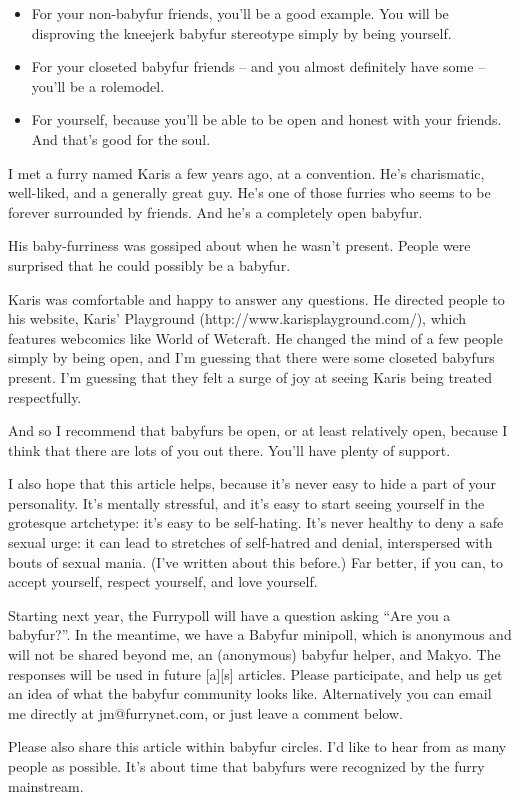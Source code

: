 \begin{itemize}
  \item For your non-babyfur friends, you'll be a good example. You will be disproving the kneejerk babyfur stereotype simply by being yourself.
  \item For your closeted babyfur friends -- and you almost definitely have some -- you'll be a rolemodel.
  \item For yourself, because you'll be able to be open and honest with your friends. And that's good for the soul.
\end{itemize}

I met a furry named Karis a few years ago, at a convention. He's charismatic, well-liked, and a generally great guy. He's one of those furries who seems to be forever surrounded by friends. And he's a completely open babyfur.

His baby-furriness was gossiped about when he wasn't present. People were surprised that he could possibly be a babyfur.

Karis was comfortable and happy to answer any questions. He directed people to his website, Karis' Playground (http://www.karisplayground.com/), which features webcomics like World of Wetcraft. He changed the mind of a few people simply by being open, and I'm guessing that there were some closeted babyfurs present. I'm guessing that they felt a surge of joy at seeing Karis being treated respectfully.

And so I recommend that babyfurs be open, or at least relatively open, because I think that there are lots of you out there. You'll have plenty of support.

I also hope that this article helps, because it's never easy to hide a part of your personality. It's mentally stressful, and it's easy to start seeing yourself in the grotesque artchetype: it's easy to be self-hating. It's never healthy to deny a safe sexual urge: it can lead to stretches of self-hatred and denial, interspersed with bouts of sexual mania. (I've written about this before.) Far better, if you can, to accept yourself, respect yourself, and love yourself.

Starting next year, the Furrypoll will have a question asking ``Are you a babyfur?''. In the meantime, we have a Babyfur minipoll, which is anonymous and will not be shared beyond  me, an (anonymous) babyfur helper, and Makyo. The responses will be used in future [a][s] articles. Please participate, and help us get an idea of what the babyfur community looks like. Alternatively you can email me directly at jm@furrynet.com, or just leave a comment below.

Please also share this article within babyfur circles. I'd like to hear from as many people as possible. It's about time that babyfurs were recognized by the furry mainstream.
